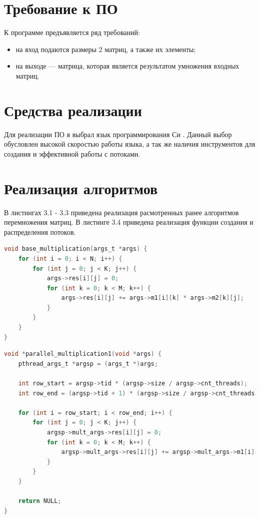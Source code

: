 \documentclass[12pt]{report}
\begin{document}
\section{Требование к ПО}

К программе предъявляется ряд требований:

\begin{itemize}
	\item на вход подаются размеры 2 матриц, а также их элементы;

	\item на выходе — матрица, которая является результатом умножения входных матриц.
\end{itemize}

\section{Средства реализации}
Для реализации ПО я выбрал язык программирования Си \cite{C}. Данный выбор обусловлен высокой скоростью работы языка, а так же наличия инструментов для создания и эффективной работы с потоками.

\section{Реализация алгоритмов}

В листингах 3.1 - 3.3 приведена реализация расмотренных ранее алгоритмов перемножения матриц.
В листинге 3.4 приведена реализация функции создания и распределения потоков.

\begin{lstlisting}[label=some-code,caption=Функция умножения матриц обычным способом, language=C]
void base_multiplication(args_t *args) {
	for (int i = 0; i < N; i++) {
		for (int j = 0; j < K; j++) {
			args->res[i][j] = 0;
			for (int k = 0; k < M; k++) {
				args->res[i][j] += args->m1[i][k] * args->m2[k][j];
			}
		}
	}
}
\end{lstlisting}

\begin{lstlisting}[label=some-code,caption=Функция умножения матриц параллельно. Способ №1,language=C]
void *parallel_multiplication1(void *args) {
	pthread_args_t *argsp = (args_t *)args;

	int row_start = argsp->tid * (argsp->size / argsp->cnt_threads);
	int row_end = (argsp->tid + 1) * (argsp->size / argsp->cnt_threads);

	for (int i = row_start; i < row_end; i++) {
		for (int j = 0; j < K; j++) {
			argsp->mult_args->res[i][j] = 0;
			for (int k = 0; k < M; k++) {
				argsp->mult_args->res[i][j] += argsp->mult_args->m1[i][k] * argsp->mult_args->m2[k][j];
			}
		}
	}

	return NULL;
}

\end{lstlisting}
\end{document}
